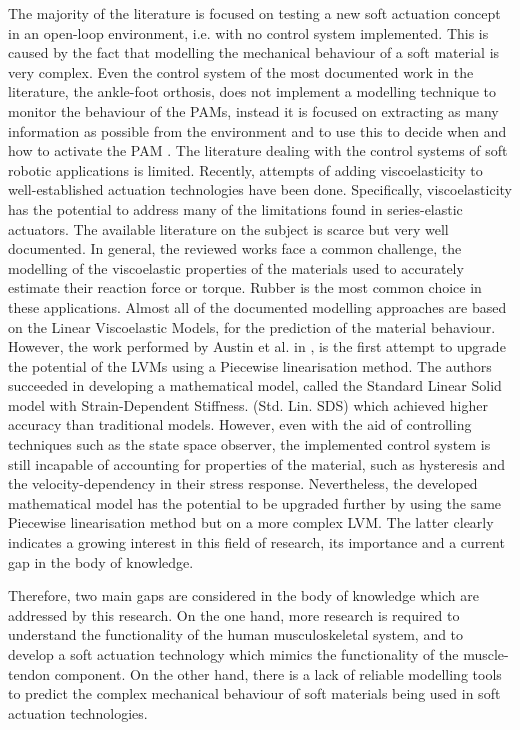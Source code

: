The majority of the literature is focused on testing a new soft actuation concept in an open-loop environment, i.e. with no control system implemented. This is caused by the fact that modelling the mechanical behaviour of a soft material is very complex. Even the control system of the most documented work in the literature, the ankle-foot orthosis, does not implement a modelling technique to monitor the behaviour of the PAMs, instead it is focused on extracting as many information as possible from the environment and to use this to decide when and how to activate the PAM \cite{park2011bio}. The literature dealing with the control systems of soft robotic applications is limited. Recently, attempts of adding viscoelasticity to well-established actuation technologies have been done. Specifically, viscoelasticity has the potential to address many of the limitations found in series-elastic actuators. The available literature on the subject is scarce but very well documented. In general, the reviewed works face a common challenge, the modelling of the viscoelastic properties of the materials used to accurately estimate their reaction force or torque. Rubber is the most common choice in these applications. Almost all of the documented modelling approaches are based on the Linear Viscoelastic Models, for the prediction of the material behaviour. However, the work performed by Austin et al. in \cite{austin2015control}, is the first attempt to upgrade the potential of the LVMs using a Piecewise linearisation method. The authors succeeded in developing a mathematical model, called the Standard Linear Solid model with Strain-Dependent Stiffness. (Std. Lin. SDS) which achieved higher accuracy than traditional models. However, even with the aid of controlling techniques such as the state space observer, the implemented control system is still incapable of accounting for properties of the material, such as hysteresis and the velocity-dependency in their stress response. Nevertheless, the developed mathematical model has the potential to be upgraded further by using the same Piecewise linearisation method but on a more complex LVM. The latter clearly indicates a growing interest in this field of research, its importance and a current gap in the body of knowledge.

Therefore, two main gaps are considered in the body of knowledge which are addressed by this research. On the one hand, more research is required to understand the functionality of the human musculoskeletal system, and to develop a soft actuation technology which mimics the functionality of the muscle-tendon component. On the other hand, there is a lack of reliable modelling tools to predict the complex mechanical behaviour of soft materials being used in soft actuation technologies.

